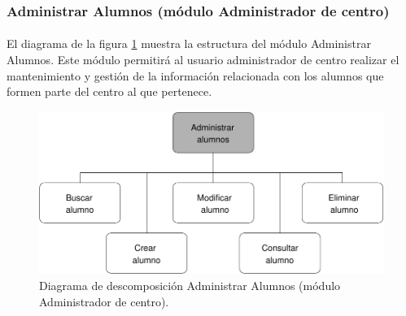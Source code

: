 \subsubsection{Administrar Alumnos (módulo Administrador de centro)}

  \paragraph{}El diagrama de la figura
  \ref{diagramaDescomposicionAdministrarAlumnos-admCentro} muestra la
  estructura del módulo Administrar Alumnos. Este módulo permitirá al usuario
  administrador de centro realizar el mantenimiento y gestión de la información
  relacionada con los alumnos que formen parte del centro al que pertenece.

  \begin{figure}[!ht]
    \begin{center}
      \includegraphics[]{11.Disenyo_Arquitectonico/11.2.Diagramas_Descomposicion/11.2.3.Modulo_administrador_centro/AdministrarBBDD/AdministrarUsuarios/AdministrarAlumnos/Diagramas/administrar_alumnos.pdf}
      \caption{Diagrama de descomposición Administrar Alumnos (módulo Administrador de centro).}
      \label{diagramaDescomposicionAdministrarAlumnos-admCentro}
    \end{center}
  \end{figure}
